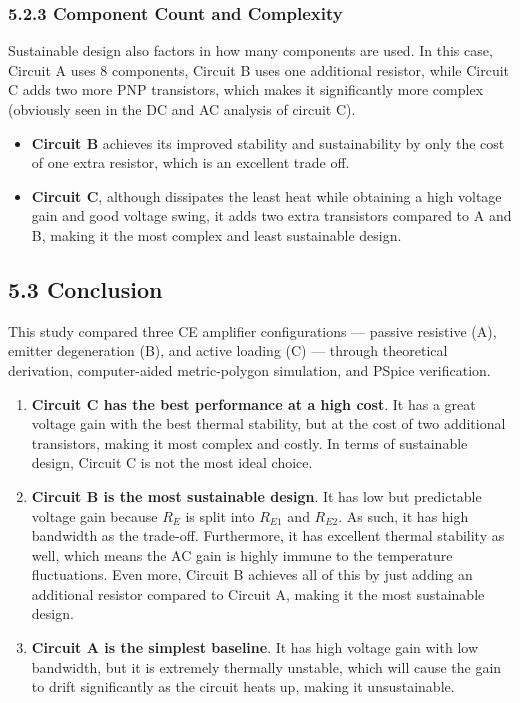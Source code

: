 \documentclass[11pt, a4paper]{article}
\begin{document}
\subsubsection*{5.2.3 Component Count and Complexity}

Sustainable design also factors in how many components are used. In this case, Circuit A uses 8 components, Circuit B uses one additional resistor, while Circuit C adds two more PNP transistors, which makes it significantly more complex (obviously seen in the DC and AC analysis of circuit C).

\begin{itemize}
    \item \textbf{Circuit B} achieves its improved stability and sustainability by only the cost of one extra resistor, which is an excellent trade off.
    \item \textbf{Circuit C}, although dissipates the least heat while obtaining a high voltage gain and good voltage swing, it adds two extra transistors compared to A and B, making it the most complex and least sustainable design.
\end{itemize}

\subsection*{5.3 Conclusion}

This study compared three CE amplifier configurations --- passive resistive (A), emitter degeneration (B), and active loading (C) --- through theoretical derivation, computer-aided metric-polygon simulation, and PSpice verification.

\begin{enumerate}
    \item \textbf{Circuit C has the best performance at a high cost}. It has a great voltage gain with the best thermal stability, but at the cost of two additional transistors, making it most complex and costly. In terms of sustainable design, Circuit C is not the most ideal choice.

    \item \textbf{Circuit B is the most sustainable design}. It has low but predictable voltage gain because $R_E$ is split into $R_{E1}$ and $R_{E2}$. As such, it has high bandwidth as the trade-off. Furthermore, it has excellent thermal stability as well, which means the AC gain is highly immune to the temperature fluctuations. Even more, Circuit B achieves all of this by just adding an additional resistor compared to Circuit A, making it the most sustainable design.

    \item \textbf{Circuit A is the simplest baseline}. It has high voltage gain with low bandwidth, but it is extremely thermally unstable, which will cause the gain to drift significantly as the circuit heats up, making it unsustainable.
\end{enumerate}
\end{document}
